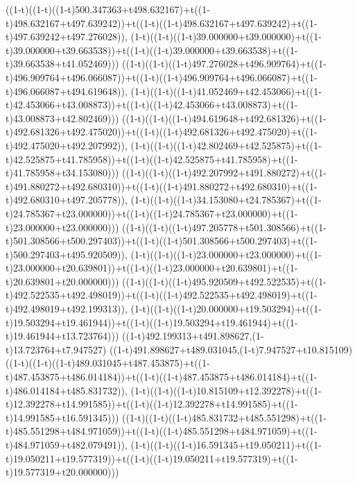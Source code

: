 ((1-t)((1-t)((1-t)500.347363+t498.632167)+t((1-t)498.632167+t497.639242))+t((1-t)((1-t)498.632167+t497.639242)+t((1-t)497.639242+t497.276028)),                                     (1-t)((1-t)((1-t)39.000000+t39.000000)+t((1-t)39.000000+t39.663538))+t((1-t)((1-t)39.000000+t39.663538)+t((1-t)39.663538+t41.052469)))
((1-t)((1-t)((1-t)497.276028+t496.909764)+t((1-t)496.909764+t496.066087))+t((1-t)((1-t)496.909764+t496.066087)+t((1-t)496.066087+t494.619648)),                                     (1-t)((1-t)((1-t)41.052469+t42.453066)+t((1-t)42.453066+t43.008873))+t((1-t)((1-t)42.453066+t43.008873)+t((1-t)43.008873+t42.802469)))
((1-t)((1-t)((1-t)494.619648+t492.681326)+t((1-t)492.681326+t492.475020))+t((1-t)((1-t)492.681326+t492.475020)+t((1-t)492.475020+t492.207992)),                                     (1-t)((1-t)((1-t)42.802469+t42.525875)+t((1-t)42.525875+t41.785958))+t((1-t)((1-t)42.525875+t41.785958)+t((1-t)41.785958+t34.153080)))
((1-t)((1-t)((1-t)492.207992+t491.880272)+t((1-t)491.880272+t492.680310))+t((1-t)((1-t)491.880272+t492.680310)+t((1-t)492.680310+t497.205778)),                                     (1-t)((1-t)((1-t)34.153080+t24.785367)+t((1-t)24.785367+t23.000000))+t((1-t)((1-t)24.785367+t23.000000)+t((1-t)23.000000+t23.000000)))
((1-t)((1-t)((1-t)497.205778+t501.308566)+t((1-t)501.308566+t500.297403))+t((1-t)((1-t)501.308566+t500.297403)+t((1-t)500.297403+t495.920509)),                                     (1-t)((1-t)((1-t)23.000000+t23.000000)+t((1-t)23.000000+t20.639801))+t((1-t)((1-t)23.000000+t20.639801)+t((1-t)20.639801+t20.000000)))
((1-t)((1-t)((1-t)495.920509+t492.522535)+t((1-t)492.522535+t492.498019))+t((1-t)((1-t)492.522535+t492.498019)+t((1-t)492.498019+t492.199313)),                                     (1-t)((1-t)((1-t)20.000000+t19.503294)+t((1-t)19.503294+t19.461944))+t((1-t)((1-t)19.503294+t19.461944)+t((1-t)19.461944+t13.723764)))
((1-t)492.199313+t491.898627,(1-t)13.723764+t7.947527)
((1-t)491.898627+t489.031045,(1-t)7.947527+t10.815109)
((1-t)((1-t)((1-t)489.031045+t487.453875)+t((1-t)487.453875+t486.014184))+t((1-t)((1-t)487.453875+t486.014184)+t((1-t)486.014184+t485.831732)),                                     (1-t)((1-t)((1-t)10.815109+t12.392278)+t((1-t)12.392278+t14.991585))+t((1-t)((1-t)12.392278+t14.991585)+t((1-t)14.991585+t16.591345)))
((1-t)((1-t)((1-t)485.831732+t485.551298)+t((1-t)485.551298+t484.971059))+t((1-t)((1-t)485.551298+t484.971059)+t((1-t)484.971059+t482.079491)),                                     (1-t)((1-t)((1-t)16.591345+t19.050211)+t((1-t)19.050211+t19.577319))+t((1-t)((1-t)19.050211+t19.577319)+t((1-t)19.577319+t20.000000)))
